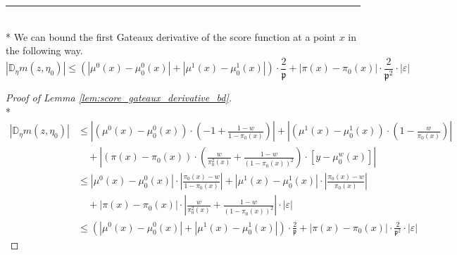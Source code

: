 \hrule

\begin{lem}\label{lem:score_gateaux_derivative_bd}\mbox{}\\*
    We can bound the first Gateaux derivative of the score function at a point $x$ in the following way.
    \begin{equation}
        \left| \mathbb{D}_{\eta} m(z, \eta_{0}) \right| \leq \left(\left| \mu^{0}(x) - \mu_{0}^{0}(x) \right| + \left| \mu^{1}(x) - \mu_{0}^{1}(x) \right|\right) \cdot \frac{2}{\mathfrak{p}}
            + \left| \pi(x) - \pi_{0}(x) \right| \cdot \frac{2}{\mathfrak{p}^{2}} \cdot \left| \varepsilon \right|
    \end{equation}
\end{lem}

\begin{proof}[Proof of Lemma \ref{lem:score_gateaux_derivative_bd}]\mbox{}\\*
    \begin{equation}
        \begin{aligned}
            \left| \mathbb{D}_{\eta} m(z, \eta_{0}) \right|
            & \leq \left|(\mu^{0}(x) - \mu_{0}^{0}(x)) \cdot \left(-1 + \frac{1 - w}{1 - \pi_{0}(x) }\right)\right|
            + \left| (\mu^{1}(x) - \mu_{0}^{1}(x)) \cdot \left(1 - \frac{w}{\pi_{0}(x)}\right)\right|\\
            & \quad + \left| (\pi(x) - \pi_{0}(x)) \cdot \left(\frac{w}{\pi_{0}^{2}(x)} + \frac{1-w}{\left(1-\pi_{0}(x)\right)^{2}}\right) \cdot \left[y - \mu_{0}^{w}(x)\right]\right| \\
            & \leq \left| \mu^{0}(x) - \mu_{0}^{0}(x) \right| \cdot \left|\frac{\pi_{0}(x) - w}{1 - \pi_{0}(x)}\right|
            + \left| \mu^{1}(x) - \mu_{0}^{1}(x) \right| \cdot \left|\frac{\pi_{0}(x) - w}{\pi_{0}(x)}\right|\\
            & \quad + \left| \pi(x) - \pi_{0}(x) \right| \cdot \left|\frac{w}{\pi_{0}^{2}(x)} + \frac{1-w}{\left(1-\pi_{0}(x)\right)^{2}} \right| \cdot \left| \varepsilon \right| \\
            & \leq \left(\left| \mu^{0}(x) - \mu_{0}^{0}(x) \right| + \left| \mu^{1}(x) - \mu_{0}^{1}(x) \right|\right) \cdot \frac{2}{\mathfrak{p}}
            + \left| \pi(x) - \pi_{0}(x) \right| \cdot \frac{2}{\mathfrak{p}^{2}} \cdot \left| \varepsilon \right|
        \end{aligned}
    \end{equation}
\end{proof}

